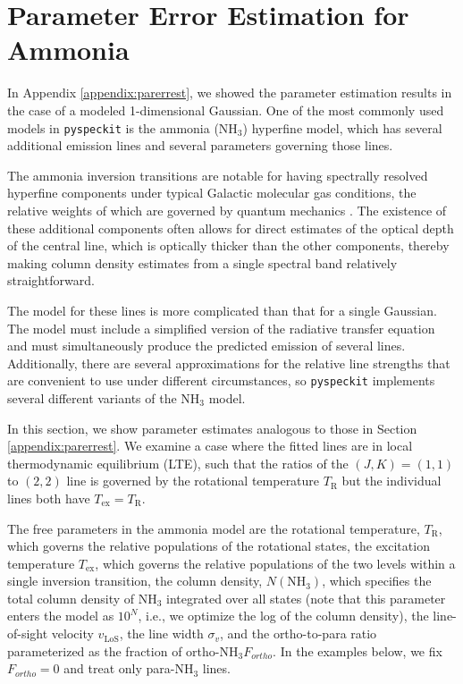 \documentclass[twocolumn,linenumbers]{aastex63}
\newcommand{\pyspeckit}{\texttt{pyspeckit}\xspace}
\newcommand{\ammonia}{\ensuremath{\mathrm{NH}_3}\xspace}
\begin{document}
\section{Parameter Error Estimation for Ammonia}
\label{appendix:parerrestammonia}
In Appendix \ref{appendix:parerrest}, we showed the parameter estimation results
in the case of a modeled 1-dimensional Gaussian.  One of the most commonly used
models in \pyspeckit is the ammonia (\ammonia) hyperfine model, which has several
additional emission lines and several parameters governing those lines.

The ammonia inversion transitions are notable for having spectrally resolved
hyperfine components under typical Galactic molecular gas conditions, the relative weights of which are governed by quantum
mechanics \citep{Mangum2015}. The existence of these additional components often
allows for direct estimates of the optical depth of the central line, which is
optically thicker than the other components, thereby making column density
estimates from a single spectral band relatively straightforward.

The model for these lines is more complicated than that for a single Gaussian.
The model must include a simplified version of the radiative transfer equation
and must simultaneously produce the predicted emission of several lines.
Additionally, there are several approximations for the relative line strengths that are convenient to use
under different circumstances, so \pyspeckit implements several different
variants of the \ammonia model.

In this section, we show parameter estimates analogous to those in Section
\ref{appendix:parerrest}.
We examine a case where the fitted lines are in local
thermodynamic equilibrium (LTE), such that the ratios of the $(J,K)=(1,1)$
to $(2,2)$ line is governed by the rotational temperature $T_\mathrm{R}$ but
the individual lines both have $T_{\mathrm{ex}}=T_{\mathrm{R}}$.

The free parameters in the ammonia model are the rotational temperature,
$T_{\mathrm{R}}$, which governs the relative populations of the rotational
states, the excitation temperature $T_{\mathrm{ex}}$, which governs the
relative populations of the two levels within a single inversion transition,
the column density, $N(\ammonia)$, which specifies the total column density of
\ammonia integrated over all states (note that this parameter enters the model
as $10^N$, i.e., we optimize the log of the column density), the line-of-sight
velocity $v_\mathrm{LoS}$, the line width $\sigma_v$, and the ortho-to-para
ratio parameterized as the fraction of ortho-\ammonia $F_{ortho}$.  In the
examples below, we fix $F_{ortho}=0$ and treat only para-\ammonia lines.
\end{document}
